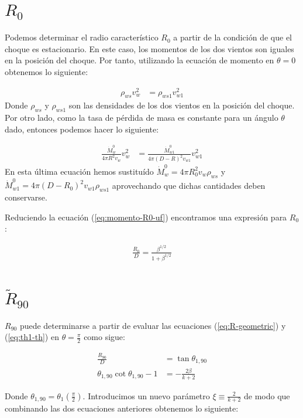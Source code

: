 \section{$R_0$}
Podemos determinar el radio característico $R_0$ a partir de la condición de que el choque es estacionario. En este caso,
los momentos de los dos vientos son iguales en la posición del choque. Por tanto, utilizando la ecuación de momento en $\theta=0$
obtenemos lo siguiente:

\begin{align}
  \rho_{ws} v^2_w &= \rho_{ws1} v^2_{w1}
\end{align}
Donde $\rho_{ws}$ y $\rho_{ws1}$ son las densidades de los dos vientos en la posición del choque. Por otro lado, como la tasa de pérdida
de masa es constante para un ángulo $\theta$ dado, entonces podemos hacer lo siguiente:

\begin{align}
  \frac{\dot{M}^0_w}{4\pi R^2 v_w}v^2_w &= \frac{\dot{M}^0_{w1}}{4\pi\left(D-R\right)^2v_{w1}}v^2_{w1} \label{eq:momento-R0-uf}
\end{align}
En esta última ecuación hemos sustituído $\dot{M}^0_w = 4\pi R_0^2 v_w \rho_{ws}$ y \\
$\dot{M}^0_{w1} = 4\pi \left(D - R_0\right)^2 v_{w1} \rho_{ws1}$ aprovechando que dichas cantidades deben conservarse.

Reduciendo la ecuación (\ref{eq:momento-R0-uf}) encontramos una expresión para $R_0$:

\begin{align}
  \frac{R_0}{D} = \frac{\beta^{1/2}}{1+\beta^{1/2}}
\end{align}

\section{$\tilde{R}_{90}$}
$R_{90}$ puede determinarse a partir de evaluar las ecuaciones (\ref{eq:R-geometric}) y (\ref{eq:th1-th}) en $\theta=\frac{\pi}{2}$
como sigue:

\begin{align}
  \frac{R_{90}}{D} &= \tan\theta_{1,90} \\
  \theta_{1,90}\cot\theta_{1,90} -1 &=  - \frac{2\beta}{k+2}
\end{align}

Donde $\theta_{1,90} = \theta_1\left(\frac{\pi}{2}\right)$. Introducimos un nuevo parámetro $\xi \equiv \frac{2}{k+2}$ de modo que
combinando las dos ecuaciones anteriores obtenemos lo siguiente:

